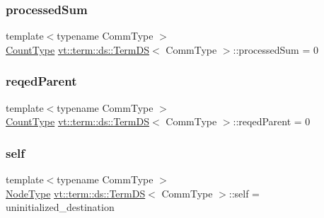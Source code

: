 \mbox{\label{structvt_1_1term_1_1ds_1_1_term_d_s_ad82335b84b7ac759e94fa524c59b03d9}} 
\subsubsection{\texorpdfstring{processed\+Sum}{processedSum}}
{\footnotesize\ttfamily template$<$typename Comm\+Type $>$ \\
\hyperlink{structvt_1_1term_1_1ds_1_1_term_d_s_a54f4ebd7e1ecb59c32c0f5b03ef9f20b}{Count\+Type} \hyperlink{structvt_1_1term_1_1ds_1_1_term_d_s}{vt\+::term\+::ds\+::\+Term\+DS}$<$ Comm\+Type $>$\+::processed\+Sum = 0\hspace{0.3cm}{\ttfamily [protected]}}

\mbox{\label{structvt_1_1term_1_1ds_1_1_term_d_s_af2aced5d22eef80e3e4d1cf761f52693}} 
\subsubsection{\texorpdfstring{reqed\+Parent}{reqedParent}}
{\footnotesize\ttfamily template$<$typename Comm\+Type $>$ \\
\hyperlink{structvt_1_1term_1_1ds_1_1_term_d_s_a54f4ebd7e1ecb59c32c0f5b03ef9f20b}{Count\+Type} \hyperlink{structvt_1_1term_1_1ds_1_1_term_d_s}{vt\+::term\+::ds\+::\+Term\+DS}$<$ Comm\+Type $>$\+::reqed\+Parent = 0\hspace{0.3cm}{\ttfamily [protected]}}

\mbox{\label{structvt_1_1term_1_1ds_1_1_term_d_s_adadcd6e130836bc8d8a6819797f6900b}} 
\subsubsection{\texorpdfstring{self}{self}}
{\footnotesize\ttfamily template$<$typename Comm\+Type $>$ \\
\hyperlink{namespacevt_a866da9d0efc19c0a1ce79e9e492f47e2}{Node\+Type} \hyperlink{structvt_1_1term_1_1ds_1_1_term_d_s}{vt\+::term\+::ds\+::\+Term\+DS}$<$ Comm\+Type $>$\+::self = uninitialized\+\_\+destination\hspace{0.3cm}{\ttfamily [protected]}}



